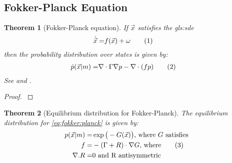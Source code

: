 \documentclass[]{article}
\newcommand\numberthis{\addtocounter{equation}{1}\tag{\theequation}}
\newtheorem{thm}{Theorem}
\begin{document}
\begin{appendices}
	
	\section{Fokker-Planck Equation}
	
	\begin{thm}[Fokker-Planck equation]
		If $\vec{x}$ satisfies the \gls{gls:sde}
		\begin{align*}
			\dot{\vec{x}} =& f(\vec{x}) + \omega \numberthis \label{eq:dynamics}
		\end{align*}
		then the probability distribution over states is given by:
		\begin{align*}
			\dot{p}(\vec{x}\vert m) =& \nabla \cdot \Gamma \nabla p -\nabla \cdot(f p) \numberthis \label{eq:fokker:planck}
		\end{align*}
		See \cite[(2.2)]{friston_life_2013} and  \cite[Chapter 33]{cvitanovic2005chaos}.
	\end{thm}
	
	\begin{proof}
		\cite[Section 33.3]{cvitanovic2005chaos}
	\end{proof}
	
	\cite{friston_life_2013,friston2012free}
	
	\begin{thm}[Equilibrium distribution for Fokker-Planck]
		The equilibrium distribution for \eqref{eq:fokker:planck} is given by:
		\begin{align*}
			p(\vec{x}\vert m) =& \exp \big(-G(\vec{x})\big) \text{, where $G$ satisfies}\\
			f =& -(\Gamma + R) \cdot \nabla G \text{, where} \numberthis \label{eq:f:Gamma:R}\\
			\nabla.R =& 0 \text{ and R antisymmetric}
		\end{align*}
		

\end{thm}
\end{appendices}
\end{document}
